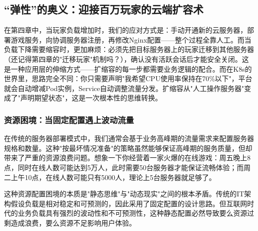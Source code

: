 
\subsection{“弹性”的奥义：迎接百万玩家的云端扩容术}

在第四章中，当玩家负载增加时，我们的应对方式是：手动开通新的云服务器，部署游戏服务，向协调服务器注册，再修改Nginx配置——整个过程全靠人工。而当负载下降需要缩容时，更加麻烦：必须先把目标服务器上的玩家迁移到其他服务器（还记得第四章的"迁移玩家"机制吗？），确认没有活跃会话后才能安全关闭。这是一种应用层的伸缩方式——扩缩容的每一步都需要业务逻辑的配合。而在K8s的世界里，思路完全不同：你只需要声明"我希望CPU使用率保持在70\%以下"，平台就会自动增减Pod实例，Service自动调整流量分发。扩缩容从"人工操作服务器"变成了"声明期望状态"，这是一次根本性的思维转换。

\subsubsection{资源困境：当固定配置遇上波动流量}

在传统的服务器部署模式中，我们通常会基于业务高峰期的流量需求来配置服务器规格和数量。这种"按最坏情况准备"的策略虽然能够保证高峰期的服务质量，但却带来了严重的资源浪费问题。想象一下你经营着一家火爆的在线游戏：周五晚上8点，同时在线人数可能达到5万人，此时需要50台服务器才能保证流畅体验；而周二上午10点，在线人数可能只有5000人，理论上5台服务器就足够了。

这种资源配置困境的本质是"静态思维"与"动态现实"之间的根本矛盾。传统的IT架构假设负载是相对稳定和可预测的，因此采用了固定配置的设计思路。但互联网时代的业务负载具有强烈的波动性和不可预测性，这种静态配置必然导致要么资源过剩造成浪费，要么资源不足影响用户体验。


